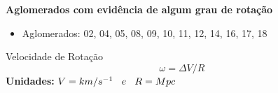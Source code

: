 \documentclass[xcolor=dvipsnames,10pt]{beamer}
\begin{document}
\begin{frame}{\textbf{Aglomerados com evidência de algum grau de rotação}}
  \begin{itemize}
    \item Aglomerados: 02, {\color{red}04}, 05, 08, 09, {\color{red}10}, 11, {\color{red}12}, 14, 16, 17, {\color{red}18}
  \end{itemize}
  \begin{block}{Velocidade de Rotação}
  \begin{equation}
    \omega= \Delta V/R 
  \end{equation}
   \textbf{Unidades:} $V = km/s^{-1}  \hspace{2 ex} e \hspace{2 ex} R = Mpc$
  \end{block}
\end{frame}
\end{document}
